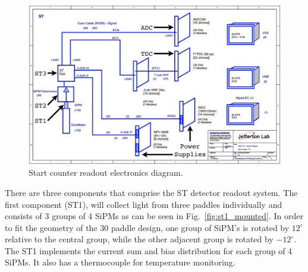 	\begin{figure}[!htb]
		\centering
		\includegraphics[width=1.0\columnwidth]{design/figs/ST_Electronics_v3}
		\caption{Start counter readout electronics diagram.}
		\label{fig:Start Counter Electronics}
	\end{figure}

There are three components that comprise the ST detector readout system.  The first component (ST1), will collect light from three paddles individually and consists of 3 groups of 4 SiPMs as can be seen in Fig.~\ref{fig:st1_mounted}.  In order to fit the geometry of the 30 paddle design, one group of SiPM's is rotated by $12^{\circ}$ relative to the central group, while the other adjacent group is rotated by $-12^{\circ}$.  The ST1 implements the current sum and bias distribution for each group of 4 SiPMs.  It also has a thermocouple for temperature monitoring.  

